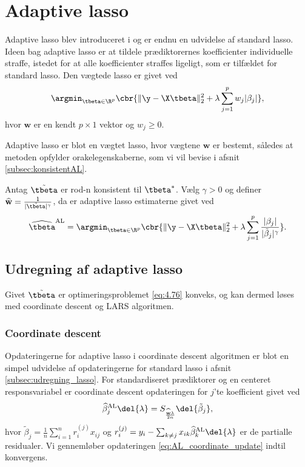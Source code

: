 \section{Adaptive lasso}
Adaptive lasso blev introduceret i \citep{adaptive_lasso} og er endnu en udvidelse af standard lasso.
Ideen bag adaptive lasso er at tildele prædiktorernes koefficienter individuelle straffe, istedet for at alle koefficienter straffes ligeligt, som er tilfældet for standard lasso.
Den vægtede lasso er givet ved
\begin{align*}
\argmin_{\tbeta \in \R^p} \cbr{\Vert \y - \X \tbeta \Vert_2^2 + \lambda \sum_{j=1}^p w_j \vert \beta_j \vert},
\end{align*}
hvor \(\mathbf{w}\) er en kendt \(p \times 1\) vektor og \(w_j \geq 0\).

Adaptive lasso er blot en vægtet lasso, hvor vægtene \(\mathbf{w}\) er bestemt, således at metoden opfylder orakelegenskaberne, som vi vil bevise i afsnit \ref{subsec:konsistentAL}.
\begin{defn}
Antag \(\tilde{\tbeta}\) er rod-n konsistent til \(\tbeta^*\).
Vælg \(\gamma>0\) og definer \(\widehat{\mathbf{w}} = \frac{1}{\vert \tilde{\tbeta} \vert^\gamma}\), da er adaptive lasso estimaterne givet ved
\begin{align}
\widehat{\tbeta}^\text{AL} = \argmin_{\tbeta \in \R^p} \cbr{ \Vert \y - \X \tbeta \Vert_2^2 + \lambda \sum_{j=1}^p \frac{ \vert \beta_j \vert}{\vert \tilde{\beta}_j \vert^\gamma}}. \label{eq:4.76}
\end{align}
\end{defn}

\subsection{Udregning af adaptive lasso}
Givet \(\tilde{\tbeta}\) er optimeringsproblemet \eqref{eq:4.76} konveks, og kan dermed løses med coordinate descent og LARS algoritmen.
\subsubsection{Coordinate descent}
Opdateringerne for adaptive lasso i coordinate descent algoritmen er blot en simpel udvidelse af opdateringerne for standard lasso i afsnit \ref{subsec:udregning_lasso}.
For standardiseret prædiktorer og en centeret responsvariabel er coordinate descent opdateringen for $j$'te koefficient givet ved
\begin{align}
\widehat{\beta}^\text{AL}_j \del{\lambda}= S_{\frac{\widehat{\mathbf{w}} \lambda}{2n}} \del{\tilde{\beta}_j}, \label{eq:AL_coordinate_update}
\end{align}
hvor \(\tilde{\beta}_j = \frac{1}{n} \sum_{i=1}^n r_{i}^{(j)} x_{ij}\) og \(r_{i}^{(j)} = y_i - \sum_{k \neq j} x_{ik} \widehat{\beta}^\text{AL}_k \del{\lambda}\) er de partialle residualer.
Vi gennemløber opdateringen \eqref{eq:AL_coordinate_update} indtil konvergens.

